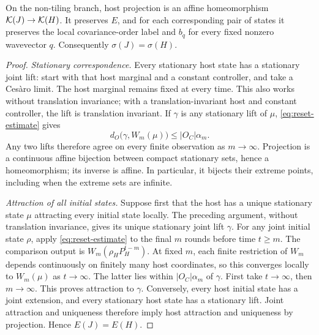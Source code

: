 \begin{proposition}\label{prop:preservation}
On the non-tiling branch, host projection is an affine homeomorphism
\(\mathcal K(J)\to\mathcal K(H)\).  It preserves \(E\), and for each corresponding
pair of states it preserves the local covariance-order label and
\(b_q\) for every fixed nonzero wavevector \(q\).  Consequently
\(\sigma(J)=\sigma(H)\).
\end{proposition}

\begin{proof}
\emph{Stationary correspondence.}
Every stationary host state has a stationary joint lift: start with
that host marginal and a constant controller, and take a Ces\`aro
limit.  The host marginal remains fixed at every time.  This also
works without translation invariance; with a translation-invariant
host and constant controller, the lift is translation invariant.
If \(\gamma\) is any stationary lift of \(\mu\),
\eqref{eq:reset-estimate} gives
\[
 d_O\bigl(\gamma,W_m(\mu)\bigr)
 \le\lvert O_C\rvert\alpha_m.
\]
Any two lifts therefore agree on every finite observation as
\(m\to\infty\).  Projection is a continuous affine bijection between
compact stationary sets, hence a homeomorphism; its inverse is
affine.  In particular, it bijects their extreme points, including
when the extreme sets are infinite.

\emph{Attraction of all initial states.}
Suppose first that the host has a unique stationary state \(\mu\)
attracting every initial state locally.  The preceding argument,
without translation invariance, gives its unique stationary joint
lift \(\gamma\).  For any joint initial state \(\rho\), apply
\eqref{eq:reset-estimate} to the final \(m\) rounds before time
\(t\ge m\).  The comparison output is
\(W_m(\rho_H P_H^{t-m})\).  At fixed \(m\), each finite restriction
of \(W_m\) depends continuously on finitely many host coordinates,
so this converges locally to \(W_m(\mu)\) as \(t\to\infty\).
The latter lies within \(\lvert O_C\rvert\alpha_m\) of
\(\gamma\).  First take \(t\to\infty\), then \(m\to\infty\).
This proves attraction to \(\gamma\).  Conversely, every host initial
state has a joint extension, and every stationary host state has a
stationary lift.  Joint attraction and uniqueness therefore imply
host attraction and uniqueness by projection.  Hence \(E(J)=E(H)\).


\end{proof}
